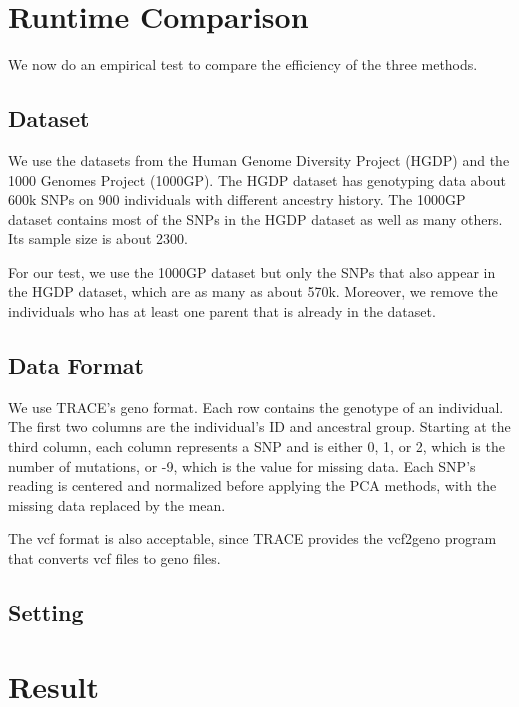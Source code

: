 \documentclass{article}[12pt]
\begin{document}
\section{Runtime Comparison}

We now do an empirical test to compare the efficiency of the three methods.

\subsection{Dataset}

We use the datasets from the Human Genome Diversity Project (HGDP) and the 1000 Genomes Project (1000GP).
The HGDP dataset has genotyping data about 600k SNPs on 900 individuals with different ancestry history.
The 1000GP dataset contains most of the SNPs in the HGDP dataset as well as many others.
Its sample size is about 2300.

For our test, we use the 1000GP dataset but only the SNPs that also appear in the HGDP dataset,
which are as many as about 570k.
Moreover, we remove the individuals who has at least one parent that is already in the dataset.



\subsection{Data Format}

We use TRACE's geno format.
Each row contains the genotype of an individual.
The first two columns are the individual's ID and ancestral group.
Starting at the third column, each column represents a SNP and is either 0, 1, or 2, which is the number of mutations, or -9, which is the value for missing data.
Each SNP's reading is centered and normalized before applying the PCA methods,
with the missing data replaced by the mean.


The vcf format is also acceptable, since TRACE provides the vcf2geno program that converts vcf files to geno files.



\subsection{Setting}






\section{Result}
\end{document}
